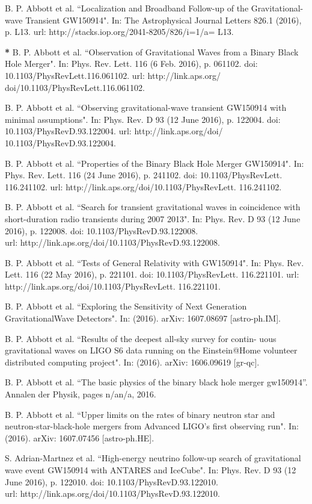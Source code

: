 B. P. Abbott et al. ``Localization and Broadband Follow-up of the Gravitational-wave Transient GW150914". In: The Astrophysical Journal Letters 826.1
(2016), p. L13. url: http://stacks.iop.org/2041-8205/826/i=1/a=
L13.

\textbf{*} B. P. Abbott et al. ``Observation of Gravitational Waves from a Binary
Black Hole Merger". In: Phys. Rev. Lett. 116 (6 Feb. 2016), p. 061102.
doi: 10.1103/PhysRevLett.116.061102. url: http://link.aps.org/
doi/10.1103/PhysRevLett.116.061102.

B. P. Abbott et al. ``Observing gravitational-wave transient GW150914
with minimal assumptions". In: Phys. Rev. D 93 (12 June 2016), p. 122004.
doi: 10.1103/PhysRevD.93.122004. url: http://link.aps.org/doi/
10.1103/PhysRevD.93.122004.

B. P. Abbott et al. ``Properties of the Binary Black Hole Merger GW150914".
In: Phys. Rev. Lett. 116 (24 June 2016), p. 241102. doi: 10.1103/PhysRevLett.
116.241102. url: http://link.aps.org/doi/10.1103/PhysRevLett.
116.241102.

B. P. Abbott et al. ``Search for transient gravitational waves in coincidence
with short-duration radio transients during 2007 2013". In: Phys. Rev. D
93 (12 June 2016), p. 122008. doi: 10.1103/PhysRevD.93.122008. \\ url:
http://link.aps.org/doi/10.1103/PhysRevD.93.122008.

B. P. Abbott et al. ``Tests of General Relativity with GW150914". In:
Phys. Rev. Lett. 116 (22 May 2016), p. 221101. doi: 10.1103/PhysRevLett.
116.221101. url: http://link.aps.org/doi/10.1103/PhysRevLett.
116.221101.

B. P. Abbott et al. ``Exploring the Sensitivity of Next Generation
GravitationalWave Detectors". In: (2016). arXiv: 1607.08697 [astro-ph.IM].

B. P. Abbott et al. ``Results of the deepest all-sky survey for contin-
uous gravitational waves on LIGO S6 data running on the Einstein@Home
volunteer distributed computing project". In: (2016). arXiv: 1606.09619
[gr-qc].

B. P. Abbott et al. ``The basic physics of the binary black hole merger gw150914''. Annalen der Physik, pages n/an/a, 2016.

B. P. Abbott et al. ``Upper limits on the rates of binary neutron
star and neutron-star-black-hole mergers from Advanced LIGO's first observing run". In: (2016). arXiv: 1607.07456 [astro-ph.HE].

S. Adrian-Martnez et al. ``High-energy neutrino follow-up search of gravitational wave event GW150914 with ANTARES and IceCube". In: Phys.
Rev. D 93 (12 June 2016), p. 122010. doi: 10.1103/PhysRevD.93.122010.
\\ url: http://link.aps.org/doi/10.1103/PhysRevD.93.122010.

\endinput